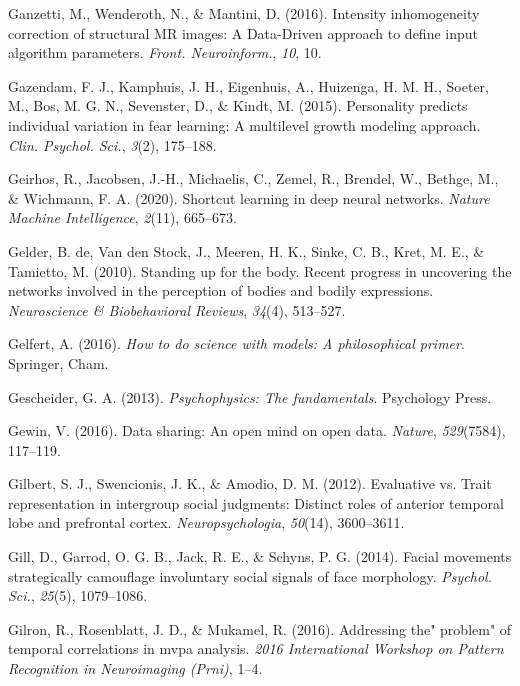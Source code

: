 \documentclass[11pt,american,a4paper,oneside,]{memoir} %
\begin{document}
\leavevmode\hypertarget{ref-Ganzetti2016-yy}{}%
Ganzetti, M., Wenderoth, N., \& Mantini, D. (2016). Intensity inhomogeneity correction of structural MR images: A Data-Driven approach to define input algorithm parameters. \emph{Front. Neuroinform.}, \emph{10}, 10.

\leavevmode\hypertarget{ref-Gazendam2015-fr}{}%
Gazendam, F. J., Kamphuis, J. H., Eigenhuis, A., Huizenga, H. M. H., Soeter, M., Bos, M. G. N., Sevenster, D., \& Kindt, M. (2015). Personality predicts individual variation in fear learning: A multilevel growth modeling approach. \emph{Clin. Psychol. Sci.}, \emph{3}(2), 175--188.

\leavevmode\hypertarget{ref-Geirhos2020-af}{}%
Geirhos, R., Jacobsen, J.-H., Michaelis, C., Zemel, R., Brendel, W., Bethge, M., \& Wichmann, F. A. (2020). Shortcut learning in deep neural networks. \emph{Nature Machine Intelligence}, \emph{2}(11), 665--673.

\leavevmode\hypertarget{ref-de2010standing}{}%
Gelder, B. de, Van den Stock, J., Meeren, H. K., Sinke, C. B., Kret, M. E., \& Tamietto, M. (2010). Standing up for the body. Recent progress in uncovering the networks involved in the perception of bodies and bodily expressions. \emph{Neuroscience \& Biobehavioral Reviews}, \emph{34}(4), 513--527.

\leavevmode\hypertarget{ref-Gelfert2016-hd}{}%
Gelfert, A. (2016). \emph{How to do science with models: A philosophical primer}. Springer, Cham.

\leavevmode\hypertarget{ref-Gescheider2013-zm}{}%
Gescheider, G. A. (2013). \emph{Psychophysics: The fundamentals}. Psychology Press.

\leavevmode\hypertarget{ref-Gewin2016-ff}{}%
Gewin, V. (2016). Data sharing: An open mind on open data. \emph{Nature}, \emph{529}(7584), 117--119.

\leavevmode\hypertarget{ref-gilbert2012evaluative}{}%
Gilbert, S. J., Swencionis, J. K., \& Amodio, D. M. (2012). Evaluative vs. Trait representation in intergroup social judgments: Distinct roles of anterior temporal lobe and prefrontal cortex. \emph{Neuropsychologia}, \emph{50}(14), 3600--3611.

\leavevmode\hypertarget{ref-Gill2014-hx}{}%
Gill, D., Garrod, O. G. B., Jack, R. E., \& Schyns, P. G. (2014). Facial movements strategically camouflage involuntary social signals of face morphology. \emph{Psychol. Sci.}, \emph{25}(5), 1079--1086.

\leavevmode\hypertarget{ref-gilron2016addressing}{}%
Gilron, R., Rosenblatt, J. D., \& Mukamel, R. (2016). Addressing the" problem" of temporal correlations in mvpa analysis. \emph{2016 International Workshop on Pattern Recognition in Neuroimaging (Prni)}, 1--4.
\end{document}
